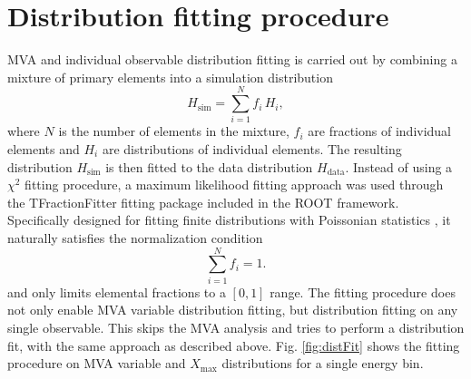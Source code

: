 \documentclass[12pt,a4paper]{report}
\begin{document}
\section{Distribution fitting procedure} \label{ch:distrib-fit}
MVA and individual observable distribution fitting is carried out by combining a mixture of primary elements into a simulation distribution
\begin{equation}\label{eq:simhistSum}
H_{\textrm{sim}} = \displaystyle\sum_{i=1}^{N}{f_i\, H_i},
\end{equation}
where $N$ is the number of elements in the mixture, $f_i$ are fractions of individual elements and $H_i$ are distributions of individual elements. The resulting distribution $H_{\textrm{sim}}$ is then fitted to the data distribution $H_{\textrm{data}}$. 
Instead of using a $\chi^2$ fitting procedure, a maximum likelihood fitting approach was used through the TFractionFitter fitting package \cite{tfractionfitter} included in the ROOT framework. Specifically designed for fitting finite distributions with Poissonian statistics \cite{finiteMCfitting}, it naturally satisfies the normalization condition
\begin{equation}
\displaystyle\sum_{i=1}^{N}{f_i} = 1.
\end{equation}
and only limits elemental fractions to a $[0,1]$ range. The fitting procedure does not only enable MVA variable distribution fitting, but distribution fitting on any single observable. This skips the MVA analysis and tries to perform a distribution fit, with the same approach as described above. Fig. \ref{fig:distFit} shows the fitting procedure on MVA variable and $X_{\textrm{max}}$ distributions for a single energy bin.
%
\end{document}

